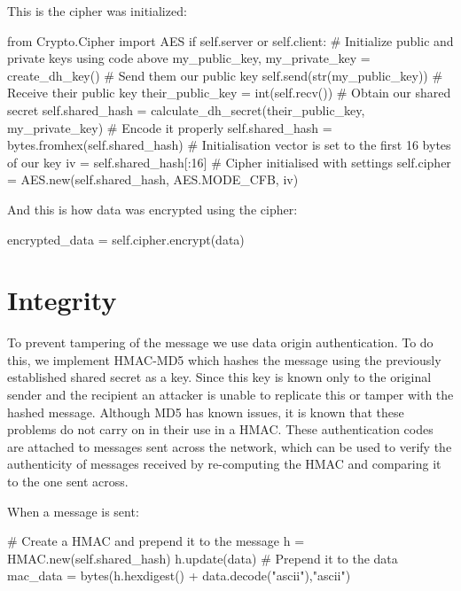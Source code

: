 \documentclass[12pt,a4paper]{article}
\begin{document}
This is the cipher was initialized:
\begin{center}
\begin{python}
from Crypto.Cipher import AES
if self.server or self.client:
    # Initialize public and private keys using code above
    my_public_key, my_private_key = create_dh_key()
    # Send them our public key
    self.send(str(my_public_key))
    # Receive their public key
    their_public_key = int(self.recv())
    # Obtain our shared secret
    self.shared_hash = calculate_dh_secret(their_public_key, my_private_key)
    # Encode it properly
    self.shared_hash = bytes.fromhex(self.shared_hash)
# Initialisation vector is set to the first 16 bytes of our key
iv = self.shared_hash[:16]
# Cipher initialised with settings
self.cipher = AES.new(self.shared_hash, AES.MODE_CFB, iv)
\end{python}
\end{center}
And this is how data was encrypted using the cipher:
\begin{center}\begin{python}
encrypted_data = self.cipher.encrypt(data)
\end{python}\end{center}

\section{Integrity}
To prevent tampering of the message we use data origin authentication. To do this, we implement HMAC-MD5 which hashes the message using the previously established shared secret as a key. Since this key is known only to the original sender and the recipient an attacker is unable to replicate this or tamper with the hashed message. Although MD5 has known issues, it is known that these problems do not carry on in their use in a HMAC. These authentication codes are attached to messages sent across the network, which can be used to verify the authenticity of messages received by re-computing the HMAC and comparing it to the one sent across.

When a message is sent:
\begin{center}\begin{python}
# Create a HMAC and prepend it to the message
h = HMAC.new(self.shared_hash)
h.update(data)
# Prepend it to the data
mac_data = bytes(h.hexdigest() + data.decode("ascii"),"ascii")
\end{python}\end{center}
\end{document}
